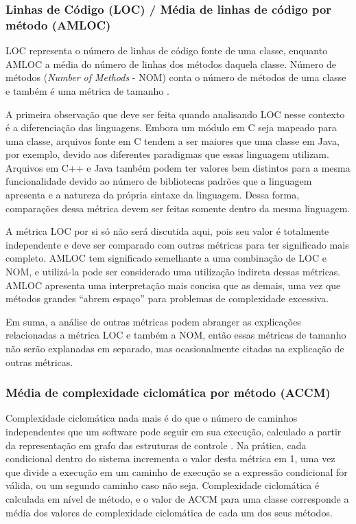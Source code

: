 \subsubsection{Linhas de Código (LOC) / Média de linhas de código por método (AMLOC)}

LOC representa o número de linhas de código fonte de uma classe, enquanto AMLOC a média do número de linhas dos métodos daquela classe. Número de métodos (\textit{Number of Methods} - NOM) conta o número de métodos de uma classe e também é uma métrica de tamanho \cite{sharma2012comparative}.

A primeira observação que deve ser feita quando analisando LOC nesse contexto é a diferenciação das linguagens. Embora um módulo em C seja mapeado para uma classe, arquivos fonte em C tendem a ser maiores que uma classe em Java, por exemplo, devido aos diferentes paradigmas que essas linguagem utilizam. Arquivos em C++ e Java também podem ter valores bem distintos para a mesma funcionalidade devido ao número de bibliotecas padrões que a linguagem apresenta e a natureza da própria sintaxe da linguagem. Dessa forma, comparações dessa métrica devem ser feitas somente dentro da mesma linguagem. 

A métrica LOC por si só não será discutida aqui, pois seu valor é totalmente independente e deve ser comparado com outras métricas para ter significado mais completo. AMLOC tem significado semelhante a uma combinação de LOC e NOM, e utilizá-la pode ser considerado uma utilização indireta dessas métricas. AMLOC apresenta uma interpretação mais concisa que as demais, uma vez que métodos grandes ``abrem espaço'' para problemas de complexidade excessiva. 

Em suma, a análise de outras métricas podem abranger as explicações relacionadas a métrica LOC e também a NOM, então essas métricas de tamanho não serão explanadas em separado, mas ocasionalmente citadas na explicação de outras métricas.

\subsubsection{Média de complexidade ciclomática por método (ACCM)}

Complexidade ciclomática nada mais é do que o número de caminhos independentes que um software pode seguir em sua execução, calculado a partir da representação em grafo das estruturas de controle \cite{shepperd1988critique}. Na prática, cada condicional dentro do sistema incrementa o valor desta métrica em 1, uma vez que divide a execução em um caminho de execução se a expressão condicional for válida, ou um segundo caminho caso não seja. Complexidade ciclomática é calculada em nível de método, e o valor de ACCM para uma classe corresponde a média dos valores de complexidade ciclomática de cada um dos seus métodos.

